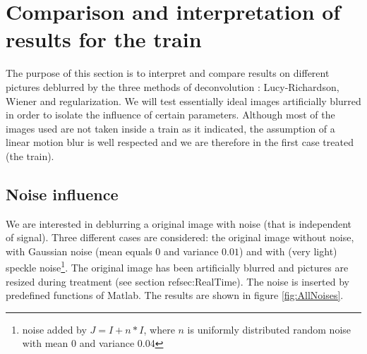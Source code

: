 \section{Comparison and interpretation of results for the train}

The purpose of this section is to interpret and compare results on different pictures deblurred by the three methods of deconvolution : Lucy-Richardson, Wiener and regularization. We will test essentially ideal images artificially blurred in order to isolate the influence of certain parameters. Although most of the images used are not taken inside a train as it indicated, the assumption of a linear motion blur is well respected and we are therefore in the first case treated (the train).

\subsection{Noise influence}

We are interested in deblurring a original image with noise (that is independent of signal). Three different cases are considered: the original image without noise, with Gaussian noise (mean equals $0$ and variance $0.01$) and with (very light) speckle noise\footnote{noise added by $J = I + n*I$, where $n$ is uniformly distributed random noise with mean 0 and variance 0.04\cite{mathWorksNoise}}. The original image has been artificially blurred and pictures are resized during treatment (see section ref{sec:RealTime}). The noise is inserted by predefined functions of Matlab. The results are shown in figure \ref{fig:AllNoises}. 

